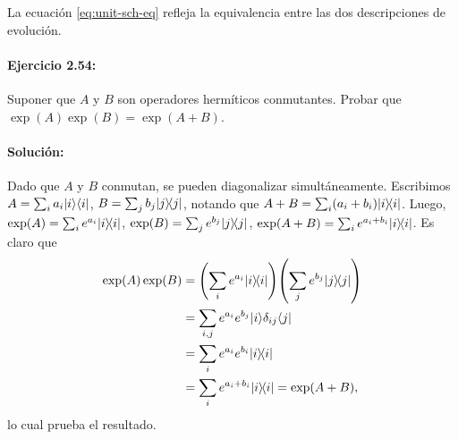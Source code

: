 La ecuación \ref{eq:unit-sch-eq} refleja la equivalencia entre las dos descripciones de evolución.

\paragraph{\cite{NC.00} Ejercicio 2.54:} Suponer que $A$ y $B$ son operadores hermíticos conmutantes. Probar que $\exp(A)\exp(B) = \exp(A + B)$.

\paragraph{Solución:} Dado que $A$ y $B$ conmutan, se pueden diagonalizar simultáneamente. Escribimos $A = \sum_i a_i\ket{i}\bra{i}$,
$B = \sum_j b_j\ketbra{j}{j}$, notando que $A + B = \sum_i (a_i + b_i)
\ketbra{i}{i}$. Luego, $\exp(A) = \sum_i e^{a_i}\ketbra{i}{i}$, $\exp(B) =
\sum_j e^{b_j}\ketbra{j}{j}$, $\exp(A + B) = \sum_i e^{a_i + b_i}
\ketbra{i}{i}$. Es claro que \begin{align*}
  \exp(A)\exp(B)
  &= \left(\sum_i e^{a_i}\ketbra{i}{i}\right)\left(\sum_j e^{b_j}
    \ketbra{j}{j}\right) \\
  &= \sum_{i, j} e^{a_i}e^{b_j}\ket{i}\delta_{ij}\bra{j} \\
  &= \sum_i e^{a_i}e^{b_i}\ketbra{i}{i} \\
  &= \sum_i e^{a_i + b_i}\ketbra{i}{i} = \exp(A + B),
\end{align*} lo cual prueba el resultado.




